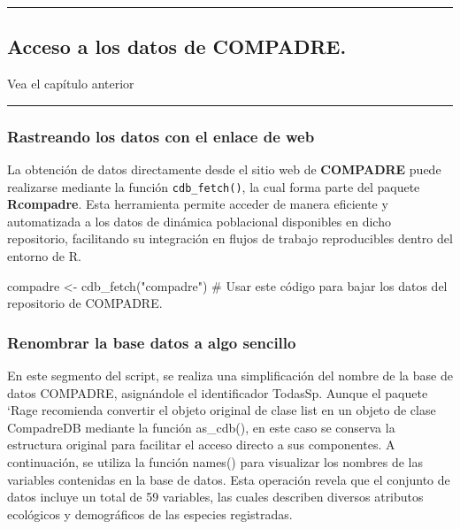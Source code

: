 \documentclass[
  12pt,
  letterpaper,
]{book}
\newenvironment{Shaded}{\begin{snugshade}}{\end{snugshade}}
\newcommand{\CommentTok}[1]{\textcolor[rgb]{0.37,0.37,0.37}{#1}}
\newcommand{\FunctionTok}[1]{\textcolor[rgb]{0.28,0.35,0.67}{#1}}
\newcommand{\NormalTok}[1]{\textcolor[rgb]{0.00,0.23,0.31}{#1}}
\newcommand{\OtherTok}[1]{\textcolor[rgb]{0.00,0.23,0.31}{#1}}
\newcommand{\StringTok}[1]{\textcolor[rgb]{0.13,0.47,0.30}{#1}}
\begin{document}
\begin{center}\rule{0.5\linewidth}{0.5pt}\end{center}

\subsection{Acceso a los datos de
COMPADRE.}\label{acceso-a-los-datos-de-compadre.}

Vea el capítulo anterior

\begin{center}\rule{0.5\linewidth}{0.5pt}\end{center}

\subsubsection{Rastreando los datos con el enlace de
web}\label{rastreando-los-datos-con-el-enlace-de-web}

La obtención de datos directamente desde el sitio web de
\textbf{COMPADRE} puede realizarse mediante la función
\texttt{cdb\_fetch()}, la cual forma parte del paquete
\textbf{Rcompadre}. Esta herramienta permite acceder de manera eficiente
y automatizada a los datos de dinámica poblacional disponibles en dicho
repositorio, facilitando su integración en flujos de trabajo
reproducibles dentro del entorno de R.

\begin{Shaded}
\begin{Highlighting}[]
\NormalTok{compadre }\OtherTok{\textless{}{-}} \FunctionTok{cdb\_fetch}\NormalTok{(}\StringTok{"compadre"}\NormalTok{) }\CommentTok{\# Usar este código para bajar los datos del repositorio de COMPADRE.}
\end{Highlighting}
\end{Shaded}

\subsubsection{Renombrar la base datos a algo
sencillo}\label{renombrar-la-base-datos-a-algo-sencillo}

En este segmento del script, se realiza una simplificación del nombre de
la base de datos COMPADRE, asignándole el identificador TodasSp. Aunque
el paquete `Rage recomienda convertir el objeto original de clase list
en un objeto de clase CompadreDB mediante la función as\_cdb(), en este
caso se conserva la estructura original para facilitar el acceso directo
a sus componentes. A continuación, se utiliza la función names() para
visualizar los nombres de las variables contenidas en la base de datos.
Esta operación revela que el conjunto de datos incluye un total de 59
variables, las cuales describen diversos atributos ecológicos y
demográficos de las especies registradas.
\end{document}
